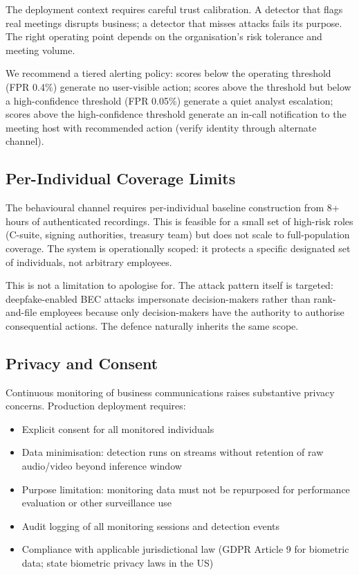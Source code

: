 \documentclass[sigconf,nonacm]{acmart}
\begin{document}
The deployment context requires careful trust calibration. A detector
that flags real meetings disrupts business; a detector that misses
attacks fails its purpose. The right operating point depends on the
organisation's risk tolerance and meeting volume.

We recommend a tiered alerting policy: scores below the operating
threshold (FPR 0.4\%) generate no user-visible action; scores above
the threshold but below a high-confidence threshold (FPR 0.05\%)
generate a quiet analyst escalation; scores above the high-confidence
threshold generate an in-call notification to the meeting host with
recommended action (verify identity through alternate channel).

\subsection{Per-Individual Coverage Limits}

The behavioural channel requires per-individual baseline construction
from 8+ hours of authenticated recordings. This is feasible for a
small set of high-risk roles (C-suite, signing authorities, treasury
team) but does not scale to full-population coverage. The system is
operationally scoped: it protects a specific designated set of
individuals, not arbitrary employees.

This is not a limitation to apologise for. The attack pattern itself
is targeted: deepfake-enabled BEC attacks impersonate decision-makers
rather than rank-and-file employees because only decision-makers
have the authority to authorise consequential actions. The defence
naturally inherits the same scope.

\subsection{Privacy and Consent}

Continuous monitoring of business communications raises substantive
privacy concerns. Production deployment requires:

\begin{itemize}
  \item Explicit consent for all monitored individuals
  \item Data minimisation: detection runs on streams without
        retention of raw audio/video beyond inference window
  \item Purpose limitation: monitoring data must not be repurposed
        for performance evaluation or other surveillance use
  \item Audit logging of all monitoring sessions and detection events
  \item Compliance with applicable jurisdictional law (GDPR Article 9
        for biometric data; state biometric privacy laws in the US)
\end{itemize}
\end{document}
